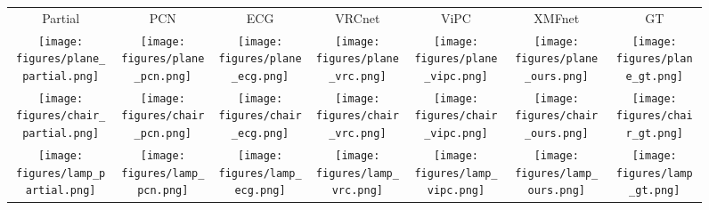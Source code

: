 \documentclass{article}
\begin{document}
\begin{figure}
\centering
\setlength\tabcolsep{1.5pt}
\begin{tabular}{ccccccc}
Partial & PCN & ECG & VRCnet & ViPC & XMFnet & GT \\ 

\texttt{[image: figures/plane\_partial.png]}
   
&
\texttt{[image: figures/plane\_pcn.png]}
   
&
\texttt{[image: figures/plane\_ecg.png]}
   
&
\texttt{[image: figures/plane\_vrc.png]}
   
&
\texttt{[image: figures/plane\_vipc.png]}
   
&
\texttt{[image: figures/plane\_ours.png]}
   
&
\texttt{[image: figures/plane\_gt.png]}

\\
\texttt{[image: figures/chair\_partial.png]}
   
&
\texttt{[image: figures/chair\_pcn.png]}
   
&
\texttt{[image: figures/chair\_ecg.png]}
   
&
\texttt{[image: figures/chair\_vrc.png]}
   
&
\texttt{[image: figures/chair\_vipc.png]}
   
&
\texttt{[image: figures/chair\_ours.png]}
   
&
\texttt{[image: figures/chair\_gt.png]}

\\
\texttt{[image: figures/lamp\_partial.png]}
   
&
\texttt{[image: figures/lamp\_pcn.png]}
   
&
\texttt{[image: figures/lamp\_ecg.png]}
   
&
\texttt{[image: figures/lamp\_vrc.png]}
   
&
\texttt{[image: figures/lamp\_vipc.png]}
   
&
\texttt{[image: figures/lamp\_ours.png]}
   
&
\texttt{[image: figures/lamp\_gt.png]}


\end{tabular}
\end{figure}
\end{document}
